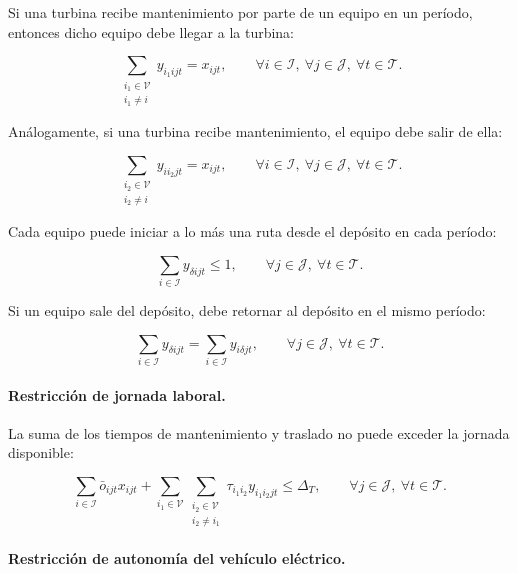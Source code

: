 Si una turbina recibe mantenimiento por parte de un equipo en un período, entonces dicho equipo debe llegar a la turbina:

\begin{equation}
\sum_{\substack{i_1\in\mathcal{V}\\ i_1\neq i}}
y_{i_1 ijt}
=
x_{ijt},
\qquad \forall i\in\mathcal{I},\ \forall j\in\mathcal{J},\ \forall t\in\mathcal{T}.
\end{equation}

Análogamente, si una turbina recibe mantenimiento, el equipo debe salir de ella:

\begin{equation}
\sum_{\substack{i_2\in\mathcal{V}\\ i_2\neq i}}
y_{i i_2 jt}
=
x_{ijt},
\qquad \forall i\in\mathcal{I},\ \forall j\in\mathcal{J},\ \forall t\in\mathcal{T}.
\end{equation}

Cada equipo puede iniciar a lo más una ruta desde el depósito en cada período:

\begin{equation}
\sum_{i\in\mathcal{I}}
y_{\delta ijt}
\leq 1,
\qquad \forall j\in\mathcal{J},\ \forall t\in\mathcal{T}.
\end{equation}

Si un equipo sale del depósito, debe retornar al depósito en el mismo período:

\begin{equation}
\sum_{i\in\mathcal{I}}
y_{\delta ijt}
=
\sum_{i\in\mathcal{I}}
y_{i\delta jt},
\qquad \forall j\in\mathcal{J},\ \forall t\in\mathcal{T}.
\end{equation}

\paragraph{Restricción de jornada laboral.}

La suma de los tiempos de mantenimiento y traslado no puede exceder la jornada disponible:

\begin{equation}
\sum_{i\in\mathcal{I}}
\bar{o}_{ijt}x_{ijt}
+
\sum_{i_1\in\mathcal{V}}
\sum_{\substack{i_2\in\mathcal{V}\\ i_2\neq i_1}}
\tau_{i_1 i_2}y_{i_1 i_2 jt}
\leq
\Delta_T,
\qquad \forall j\in\mathcal{J},\ \forall t\in\mathcal{T}.
\end{equation}

\paragraph{Restricción de autonomía del vehículo eléctrico.}

